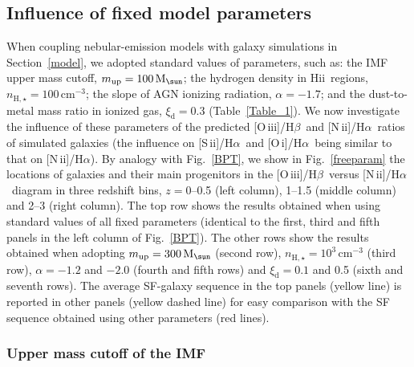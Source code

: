 \documentclass[fleqn,usenatbib]{mnras}
\newcommand{\Msun}{\hbox{M$_\sun$}}
\newcommand{\hii}{\hbox{H{\sc ii}}}
\newcommand{\oiiihb}{\hbox{[O\,{\sc iii}]/H$\beta$}}
\newcommand{\niiha}{\hbox{[N\,{\sc ii}]/H$\alpha$}}
\newcommand{\siiha}{\hbox{[S\,{\sc ii}]/H$\alpha$}}
\newcommand{\oiha}{\hbox{[O\,{\sc i}]/H$\alpha$}}
\begin{document}
\subsection{Influence of fixed model parameters}\label{fixparams} 

When coupling nebular-emission models with galaxy simulations in
Section~\ref{model}, we adopted standard values of parameters, such
as: the IMF upper mass cutoff,  $m_{\mathrm{up}}=100\,\Msun$; the
hydrogen density in \hii\ regions, $n_{\mathrm{H},
  \star}=100\,\mathrm{cm}^{-3}$; the slope of AGN ionizing radiation,
$\alpha =-1.7$; and the dust-to-metal mass ratio in ionized gas,
$\xi_\mathrm{d}=0.3$ (Table~\ref{Table_1}). We now investigate the
influence of these parameters of the predicted \oiiihb\ and \niiha\
ratios of simulated  galaxies (the influence on \siiha\ and \oiha\
being similar to that on \niiha). By analogy with  Fig.~\ref{BPT}, we
show in Fig.~\ref{freeparam} the locations of galaxies and their main
progenitors in the  \oiiihb\ versus \niiha\ diagram in three redshift
bins, $z=0$--0.5 (left column), 1--1.5 (middle column) and 2--3 (right
column). The top row shows the results obtained when using standard
values of all fixed parameters (identical to the first, third and
fifth panels in the left column of Fig.~\ref{BPT}). The other rows
show the results obtained when adopting $m_{\mathrm{up}}=300\,\Msun$
(second row),  $n_{\mathrm{H}, \star}=10^3\,\mathrm{cm}^{-3}$ (third
row), $\alpha =-1.2$ and $-2.0$ (fourth and fifth rows) and
$\xi_\mathrm{d}=0.1$ and 0.5 (sixth and  seventh rows). The average
SF-galaxy sequence in the top panels (yellow line) is reported in
other panels (yellow dashed line) for easy comparison with  the SF
sequence obtained using other parameters (red lines).  

\subsubsection{Upper mass cutoff of the IMF}
\end{document}
